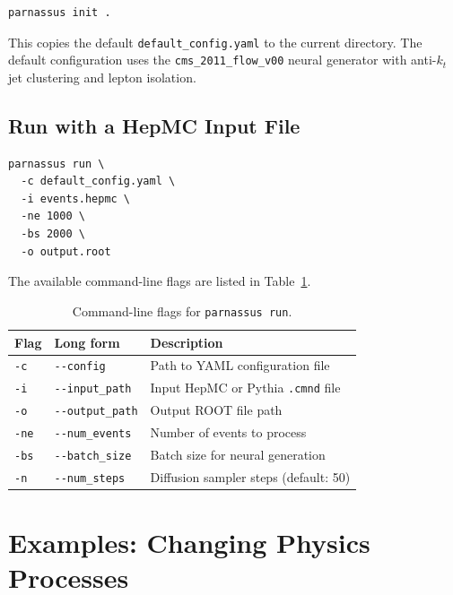 \documentclass[11pt,a4paper]{article}
\begin{document}
\begin{lstlisting}[style=bash]
parnassus init .
\end{lstlisting}

This copies the default \texttt{default\_config.yaml} to the current directory.
The default configuration uses the \texttt{cms\_2011\_flow\_v00} neural generator
with anti-$k_t$ jet clustering and lepton isolation.

\subsection{Run with a HepMC Input File}

\begin{lstlisting}[style=bash,caption={Basic command-line invocation.}]
parnassus run \
  -c default_config.yaml \
  -i events.hepmc \
  -ne 1000 \
  -bs 2000 \
  -o output.root
\end{lstlisting}

\noindent
The available command-line flags are listed in Table~\ref{tab:cli}.

\begin{table}[H]
\centering
\caption{Command-line flags for \texttt{parnassus run}.}
\label{tab:cli}
\begin{tabular}{@{}lll@{}}
\toprule
\textbf{Flag} & \textbf{Long form} & \textbf{Description} \\
\midrule
\texttt{-c} & \texttt{-{}-config}      & Path to YAML configuration file \\
\texttt{-i} & \texttt{-{}-input\_path}  & Input HepMC or Pythia \texttt{.cmnd} file \\
\texttt{-o} & \texttt{-{}-output\_path} & Output ROOT file path \\
\texttt{-ne} & \texttt{-{}-num\_events} & Number of events to process \\
\texttt{-bs} & \texttt{-{}-batch\_size} & Batch size for neural generation \\
\texttt{-n} & \texttt{-{}-num\_steps}   & Diffusion sampler steps (default: 50) \\
\bottomrule
\end{tabular}
\end{table}

\section{Examples: Changing Physics Processes}
\label{sec:examples}
\end{document}
